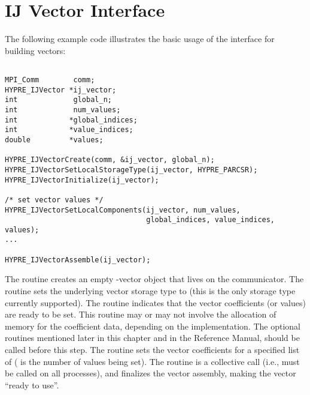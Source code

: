 %


\section{IJ Vector Interface}

The following example code illustrates the basic usage of the
 interface for building vectors:
\begin{display}
\begin{verbatim}

MPI_Comm        comm;
HYPRE_IJVector *ij_vector;
int             global_n;
int             num_values;
int            *global_indices;
int            *value_indices;
double         *values;

HYPRE_IJVectorCreate(comm, &ij_vector, global_n);
HYPRE_IJVectorSetLocalStorageType(ij_vector, HYPRE_PARCSR);
HYPRE_IJVectorInitialize(ij_vector);

/* set vector values */
HYPRE_IJVectorSetLocalComponents(ij_vector, num_values,
                                 global_indices, value_indices, values);
...

HYPRE_IJVectorAssemble(ij_vector);

\end{verbatim}
\end{display}
The  routine creates an empty -vector
object that lives on the  communicator.  The
 routine sets the underlying vector storage
type to  (this is the only storage type currently
supported).  The  routine indicates that the vector
coefficients (or values) are ready to be set.  This routine may or may
not involve the allocation of memory for the coefficient data,
depending on the implementation.  The optional  routines
mentioned later in this chapter and in the Reference Manual, should be
called before this step.  The  routine sets
the vector coefficients for a specified list of 
( is the number of values being set).  The 
routine is a collective call (i.e., must be called on all processes),
and finalizes the vector assembly, making the vector ``ready to use''.

